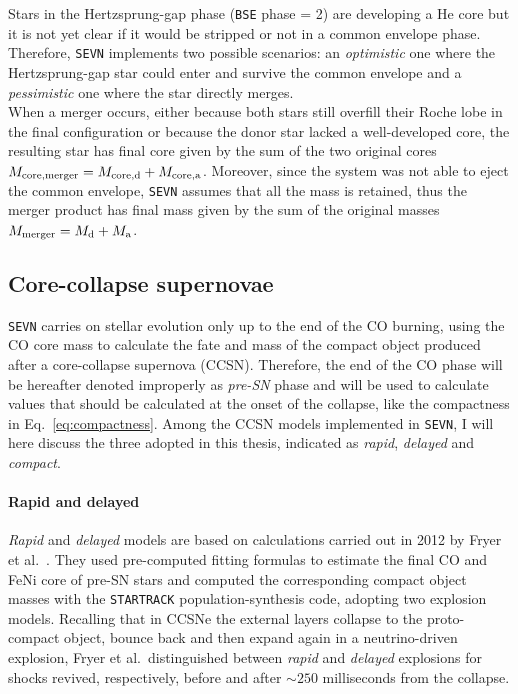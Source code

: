 \documentclass[a4paper,titlepage]{book}     	%
\begin{document}
Stars in the Hertzsprung-gap phase (\texttt{BSE} phase = 2) are developing a He core but it is not yet clear if it would be stripped or not in a common envelope phase. Therefore, \texttt{SEVN} implements two possible scenarios: an \emph{optimistic} one where the Hertzsprung-gap star could enter and survive the common envelope and a \emph{pessimistic} one where the star directly merges. \\

When a merger occurs, either because both stars still overfill their Roche lobe in the final configuration or because the donor star lacked a well-developed core, the resulting star has final core given by the sum of the two original cores $M_{\rm core,merger} = M_{\rm core, d} + M_{\rm core, a}$. Moreover, since the system was not able to eject the common envelope, \texttt{SEVN} assumes that all the mass is retained, thus the merger product has final mass given by the sum of the original masses $M_{\rm merger} = M_{\rm d} + M_{\rm a}$.





\subsection{Core-collapse supernovae}\label{subsec:SNmodels}
\texttt{SEVN} carries on stellar evolution only up to the end of the CO burning, using the CO core mass to calculate the fate and mass of the compact object produced after a core-collapse supernova (CCSN). Therefore, the end of the CO phase will be hereafter denoted improperly as \emph{pre-SN} phase and will be used to calculate values that should be calculated at the onset of the collapse, like the compactness in Eq.\ \ref{eq:compactness}. Among the CCSN models implemented in \texttt{SEVN}, I will here discuss the three adopted in this thesis, indicated as \emph{rapid}, \emph{delayed} and \emph{compact}.

\paragraph{Rapid and delayed} \emph{Rapid} and \emph{delayed} models are based on calculations carried out in 2012 by Fryer et al.\ \cite{Fryer2012}. They used pre-computed fitting formulas to estimate the final CO and FeNi core of pre-SN stars and computed the corresponding compact object masses with the \texttt{STARTRACK} \cite{Belczynski2010_WRwindsSTARTRACK} population-synthesis code, adopting two explosion models. Recalling that in CCSNe the external layers collapse to the proto-compact object, bounce back and then expand again in a neutrino-driven explosion, Fryer et al.\ distinguished between \emph{rapid} and \emph{delayed} explosions for shocks revived, respectively, before and after $\sim 250$ milliseconds from the collapse. 
\end{document}

